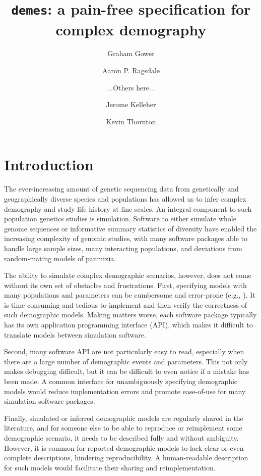 \documentclass[11pt]{article}
\newcommand{\demes}[0]{\texttt{demes}}
\begin{document}
\title{\demes: a pain-free specification for complex demography}
\author[*]{Graham Gower}
\author[*]{Aaron P. Ragsdale}
\author[ ]{...Others here...}
\author[**]{Jerome Kelleher}
\author[**]{Kevin Thornton}
\maketitle

\abstract{
}

\section*{Introduction}

The ever-increasing amount of genetic sequencing data from genetically and
geographically diverse species and populations has allowed us to infer complex
demography and study life history at fine scales. An integral component to such
population genetics studies is simulation. Software to either simulate whole
genome sequences
\citep{thornton2014c++,kelleher2016efficient,haller2019slim,adrion2020community}
or informative summary statistics of diversity
\citep{gutenkunst2009inferring,kamm2017efficient,jouganous2017inferring} have
enabled the increasing complexity of genomic studies, with many software
packages able to handle large sample sizes, many interacting populations, and
deviations from random-mating models of panmixia.

The ability to simulate complex demographic scenarios, however, does not come
without its own set of obstacles and frustrations. First, specifying models
with many populations and parameters can be cumbersome and error-prone (e.g.,
\citep{ragsdale2020lessons}). It is time-consuming and tedious to implement and
then verify the correctness of such demographic models. Making matters worse,
each software package typically has its own application programming interface
(API), which makes it difficult to translate models between simulation
software.

Second, many software API are not particularly easy to read, especially when
there are a large number of demographic events and parameters. This not only
makes debugging difficult, but it can be difficult to even notice if a mistake
has been made. A common interface for unambiguously specifying demographic
models would reduce implementation errors and promote ease-of-use for many
simulation software packages.

Finally, simulated or inferred demographic models are regularly shared in the
literature, and for someone else to be able to reproduce or reimplement some
demographic scenario, it needs to be described fully and without ambiguity.
However, it is common for reported demographic models to lack clear or even
complete descriptions, hindering reproducibility. A human-readable description
for such models would facilitate their sharing and reimplementation.
\end{document}
